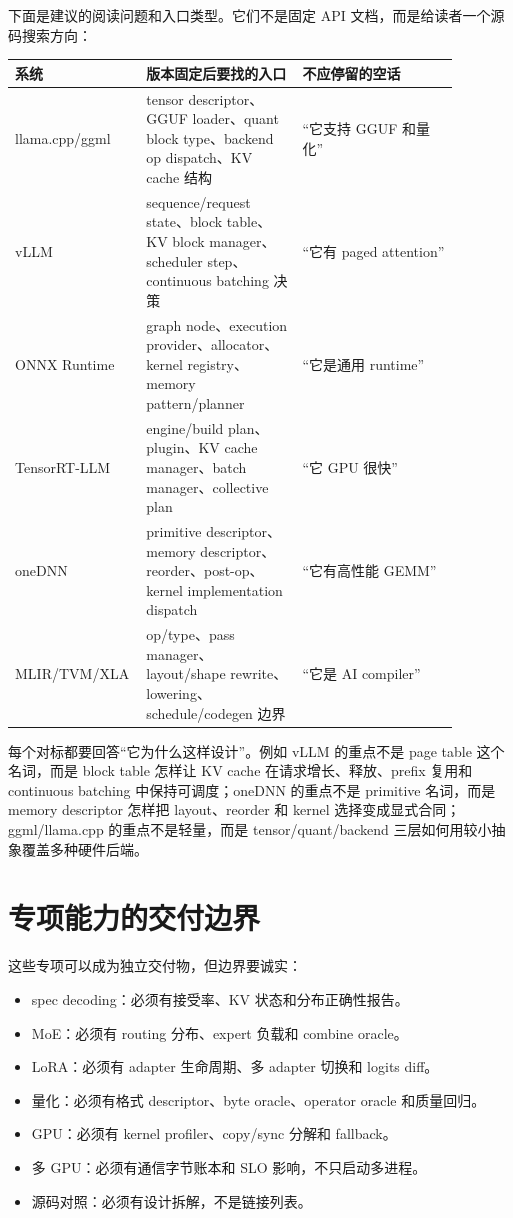 下面是建议的阅读问题和入口类型。它们不是固定 API 文档，而是给读者一个源码搜索方向：

\begin{center}
\small
\begin{tabular}{p{0.20\linewidth}p{0.34\linewidth}p{0.34\linewidth}}
\toprule
系统 & 版本固定后要找的入口 & 不应停留的空话 \\
\midrule
llama.cpp/ggml & tensor descriptor、GGUF loader、quant block type、backend op dispatch、KV cache 结构 & “它支持 GGUF 和量化” \\
vLLM & sequence/request state、block table、KV block manager、scheduler step、continuous batching 决策 & “它有 paged attention” \\
ONNX Runtime & graph node、execution provider、allocator、kernel registry、memory pattern/planner & “它是通用 runtime” \\
TensorRT-LLM & engine/build plan、plugin、KV cache manager、batch manager、collective plan & “它 GPU 很快” \\
oneDNN & primitive descriptor、memory descriptor、reorder、post-op、kernel implementation dispatch & “它有高性能 GEMM” \\
MLIR/TVM/XLA & op/type、pass manager、layout/shape rewrite、lowering、schedule/codegen 边界 & “它是 AI compiler” \\
\bottomrule
\end{tabular}
\end{center}

每个对标都要回答“它为什么这样设计”。例如 vLLM 的重点不是 page table 这个名词，而是 block table 怎样让 KV cache 在请求增长、释放、prefix 复用和 continuous batching 中保持可调度；oneDNN 的重点不是 primitive 名词，而是 memory descriptor 怎样把 layout、reorder 和 kernel 选择变成显式合同；ggml/llama.cpp 的重点不是轻量，而是 tensor/quant/backend 三层如何用较小抽象覆盖多种硬件后端。

\section{专项能力的交付边界}

这些专项可以成为独立交付物，但边界要诚实：

\begin{itemize}
  \item spec decoding：必须有接受率、KV 状态和分布正确性报告。
  \item MoE：必须有 routing 分布、expert 负载和 combine oracle。
  \item LoRA：必须有 adapter 生命周期、多 adapter 切换和 logits diff。
  \item 量化：必须有格式 descriptor、byte oracle、operator oracle 和质量回归。
  \item GPU：必须有 kernel profiler、copy/sync 分解和 fallback。
  \item 多 GPU：必须有通信字节账本和 SLO 影响，不只启动多进程。
  \item 源码对照：必须有设计拆解，不是链接列表。
\end{itemize}

